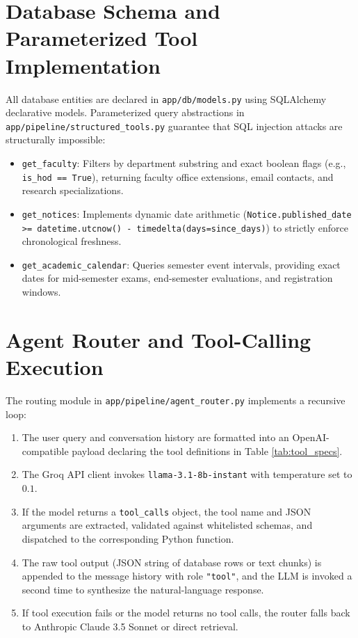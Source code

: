 \documentclass[12pt,a4paper]{report}
\begin{document}
\section{Database Schema and Parameterized Tool Implementation}
All database entities are declared in \texttt{app/db/models.py} using SQLAlchemy declarative models. Parameterized query abstractions in \texttt{app/pipeline/structured\_tools.py} guarantee that SQL injection attacks are structurally impossible:
\begin{itemize}
    \item \texttt{get\_faculty}: Filters by department substring and exact boolean flags (e.g., \texttt{is\_hod == True}), returning faculty office extensions, email contacts, and research specializations.
    \item \texttt{get\_notices}: Implements dynamic date arithmetic (\texttt{Notice.published\_date >= datetime.utcnow() - timedelta(days=since\_days)}) to strictly enforce chronological freshness.
    \item \texttt{get\_academic\_calendar}: Queries semester event intervals, providing exact dates for mid-semester exams, end-semester evaluations, and registration windows.
\end{itemize}

\section{Agent Router and Tool-Calling Execution}
The routing module in \texttt{app/pipeline/agent\_router.py} implements a recursive loop:
\begin{enumerate}
    \item The user query and conversation history are formatted into an OpenAI-compatible payload declaring the tool definitions in Table \ref{tab:tool_specs}.
    \item The Groq API client invokes \texttt{llama-3.1-8b-instant} with temperature set to $0.1$.
    \item If the model returns a \texttt{tool\_calls} object, the tool name and JSON arguments are extracted, validated against whitelisted schemas, and dispatched to the corresponding Python function.
    \item The raw tool output (JSON string of database rows or text chunks) is appended to the message history with role \texttt{"tool"}, and the LLM is invoked a second time to synthesize the natural-language response.
    \item If tool execution fails or the model returns no tool calls, the router falls back to Anthropic Claude 3.5 Sonnet or direct retrieval.
\end{enumerate}
\end{document}
